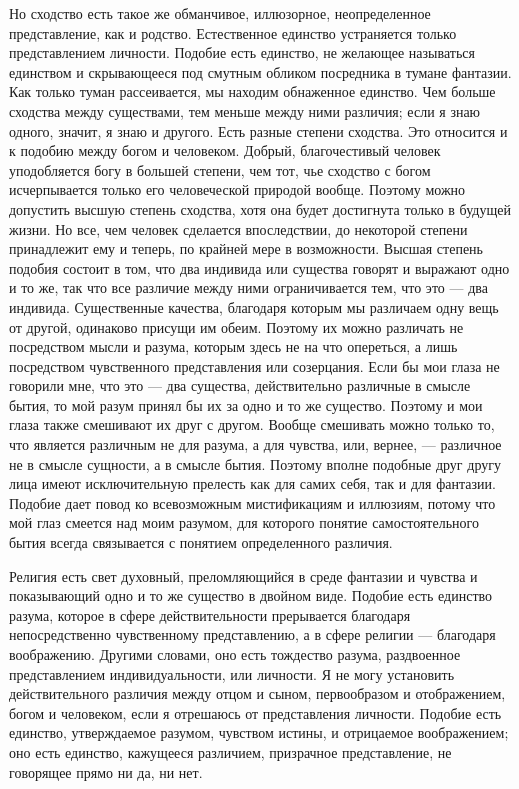 \documentclass[12pt,oneside]{book}
\begin{document}
Но сходство есть такое же обманчивое, иллюзорное, неопределенное представление, как и родство. Естественное единство устраняется только представлением личности. Подобие есть единство, не желающее называться единством и скрывающееся под смутным обликом посредника в тумане фантазии. Как только туман рассеивается, мы находим обнаженное единство. Чем больше сходства между существами, тем меньше между ними различия; если я знаю одного, значит, я знаю и другого. Есть разные степени сходства. Это относится и к подобию между богом и человеком. Добрый, благочестивый человек уподобляется богу в большей степени, чем тот, чье сходство с богом исчерпывается только его человеческой природой вообще. Поэтому можно допустить высшую степень сходства, хотя она будет достигнута только в будущей жизни. Но все, чем человек сделается впоследствии, до некоторой степени принадлежит ему и теперь, по крайней мере в возможности. Высшая степень подобия состоит в том, что два индивида или существа говорят и выражают одно и то же, так что все различие между ними ограничивается тем, что это --- два индивида. Существенные качества, благодаря которым мы различаем одну вещь от другой, одинаково присущи им обеим. Поэтому их можно различать не посредством мысли и разума, которым здесь не на что опереться, а лишь посредством чувственного представления или созерцания. Если бы мои глаза не говорили мне, что это --- два существа, действительно различные в смысле бытия, то мой разум принял бы их за одно и то же существо. Поэтому и мои глаза также смешивают их друг с другом. Вообще смешивать можно только то, что является различным не для разума, а для чувства, или, вернее, --- различное не в смысле сущности, а в смысле бытия. Поэтому вполне подобные друг другу лица имеют исключительную прелесть как для самих себя, так и для фантазии. Подобие дает повод ко всевозможным мистификациям и иллюзиям, потому что мой глаз смеется над моим разумом, для которого понятие самостоятельного бытия всегда связывается с понятием определенного различия.

Религия есть свет духовный, преломляющийся в среде фантазии и чувства и показывающий одно и то же существо в двойном виде. Подобие есть единство разума, которое в сфере действительности прерывается благодаря непосредственно чувственному представлению, а в сфере религии --- благодаря воображению. Другими словами, оно есть тождество разума, раздвоенное представлением индивидуальности, или личности. Я не могу установить действительного различия между отцом и сыном, первообразом и отображением, богом и человеком, если я отрешаюсь от представления личности. Подобие есть единство, утверждаемое разумом, чувством истины, и отрицаемое воображением; оно есть единство, кажущееся различием, призрачное представление, не говорящее прямо ни да, ни нет.
\end{document}
